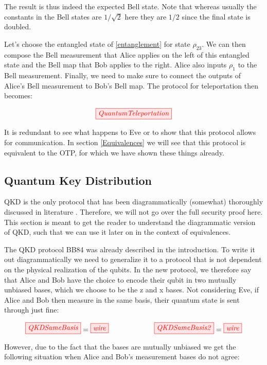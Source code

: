 \documentclass[]{article}
\begin{document}
The result is thus indeed the expected Bell state. Note that whereas usually the constants in the Bell states are $1/\sqrt{2}$ here they are $1/2$ since the final state is doubled.

Let's choose the entangled state of \ref{entanglement} for state $\rho_{23}$. We can then compose the Bell measurement that Alice applies on the left of this entangled state and the Bell map that Bob applies to the right. Alice also inputs $\rho_1$ to the Bell measurement. Finally, we need to make sure to connect the outputs of Alice's Bell measurement to Bob's Bell map. The protocol for teleportation then becomes: 
 
\begin{equation}
	\tikzfig{QuantumTeleportation}
\end{equation}
 
It is redundant to see what happens to Eve or to show that this protocol allows for communication. In section \ref{Equivalences} we will see that this protocol is equivalent to the OTP, for which we have shown these things already. 
 
\subsection{Quantum Key Distribution}

QKD is the only protocol that has been diagrammatically (somewhat) thoroughly discussed in literature \cite{kissinger2017}. Therefore, we will not go over the full security proof here. This section is meant to get the reader to understand the diagrammatic version of QKD, such that we can use it later on in the context of equivalences.

The QKD protocol BB84 was already described in the introduction. To write it out diagrammatically we need to generalize it to a protocol that is not dependent on the physical realization of the qubits. In the new protocol, we therefore say that Alice and Bob have the choice to encode their qubit in two mutually unbiased bases, which we choose to be the z and x bases. Not considering Eve, if Alice and Bob then measure in the same basis, their quantum state is sent through just fine:

\begin{equation}
	\tikzfig{QKDSameBasis} = \tikzfig{wire} ~~~~~~~~~~~~~~~~~~~ \tikzfig{QKDSameBasis2} = \tikzfig{wire}
\end{equation}

However, due to the fact that the bases are mutually unbiased we get the following situation when Alice and Bob's measurement bases do not agree:
\end{document}
